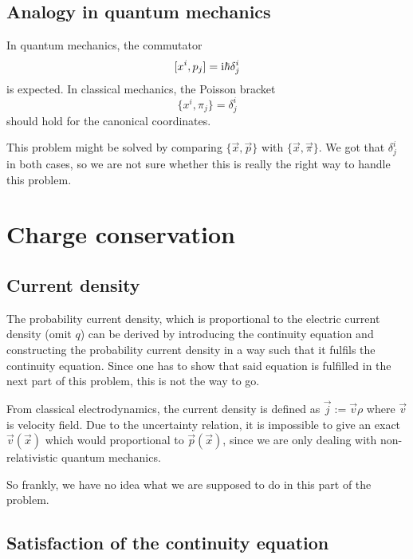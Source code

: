 \documentclass[11pt, english, fleqn, DIV=15, headinclude, BCOR=1cm]{scrartcl}
\begin{document}
\subsection{Analogy in quantum mechanics}

In quantum mechanics, the commutator
\[
    [x^i, p_j] = \mathrm i \hbar \delta^i_j
\]
is expected. In classical mechanics, the Poisson bracket
\[
    \{x^i, \pi_j\} = \delta^i_j
\]
should hold for the canonical coordinates.

This problem might be solved by comparing $\{\vec x, \vec p\}$ with $\{\vec x,
\vec \pi\}$. We got that $\delta^i_j$ in both cases, so we are not sure whether
this is really the right way to handle this problem.


\section{Charge conservation} %

\newcommand\cc{\mathop{}\text{c.c.}}
\newcommand\hc{\mathop{}\text{h.c.}}

\subsection{Current density}

The probability current density, which is proportional to the electric current
density (omit $q$) can be derived by introducing the continuity equation and
constructing the probability current density in a way such that it fulfils the
continuity equation. Since one has to show that said equation is fulfilled in
the next part of this problem, this is not the way to go.

From classical electrodynamics, the current density is defined as $\vec j :=
\vec v \rho$ where $\vec v$ is velocity field. Due to the uncertainty relation,
it is impossible to give an exact $\vec v(\vec x)$ which would proportional to
$\vec p(\vec x)$, since we are only dealing with non-relativistic quantum
mechanics.

So frankly, we have no idea what we are supposed to do in this part of the
problem.


\subsection{Satisfaction of the continuity equation}
\end{document}
